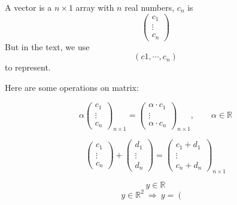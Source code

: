 \begin{note}
A vector is a $n\times1$ array with $n$ real numbers, $c_n$ is $$\left(\begin{matrix}
    c_1\\ \vdots \\ c_n
\end{matrix}\right)$$
But in the text, we use $$(c1, \cdots, c_n)$$ to represent.
\end{note}

\begin{definition*}
    Here are some operations on matrix:
    \begin{definition}
        \[
        \alpha \left(
        \begin{matrix}
            c_1\\ \vdots \\ c_n
        \end{matrix}
        \right)_{n\times1} = 
        \left(
        \begin{matrix}
            \alpha \cdot c_1\\ \vdots \\ \alpha \cdot c_n
        \end{matrix}
        \right)_{n\times1}, \qquad \alpha \in \mathbb{R}
        \]
    \end{definition}
    \begin{definition}
        \[
        \left(
        \begin{matrix}
            c_1\\ \vdots \\ c_n
        \end{matrix}
        \right) + 
        \left(
        \begin{matrix}
            d_1\\ \vdots \\ d_n
        \end{matrix}
        \right)
        = 
        \left(
        \begin{matrix}
            c_1+d_1\\ \vdots \\ c_n + d_n
        \end{matrix}
        \right)_{n\times1}
        \]
    \end{definition}
    \begin{definition}
        \[
        y \in \mathbb{R}
        \]
        \vspace{1pt}
        \[
        y \in \mathbb{R}^2 \ \Longrightarrow  \ y = \left(\begin{matrix}

\end{matrix}\]
\end{definition}
\end{definition*}
